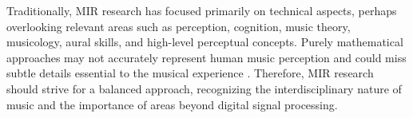 Traditionally, MIR research has focused primarily on technical aspects, perhaps overlooking relevant areas such as perception, cognition, music theory, musicology, aural skills, and high-level perceptual concepts. Purely mathematical approaches may not accurately represent human music perception and could miss subtle details essential to the musical experience \cite{neglecteduser2013}. Therefore, MIR research should strive for a balanced approach, recognizing the interdisciplinary nature of music and the importance of areas beyond digital signal processing.


